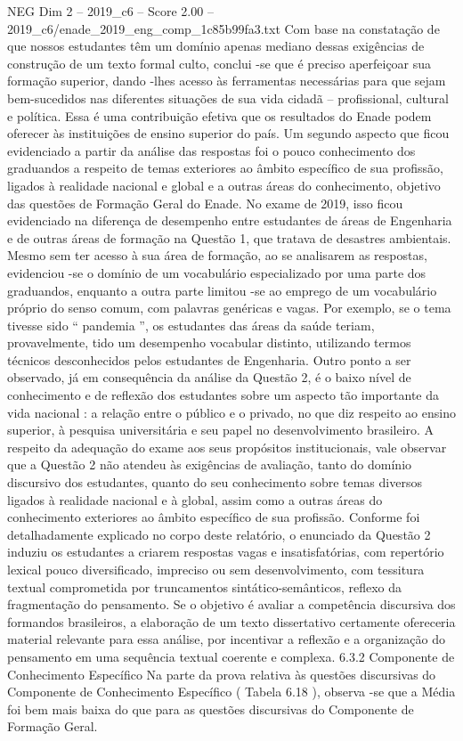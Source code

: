 \begin{textsample}{NEG Dim 2 – 2019\_c6 – Score 2.00 – 2019\_c6/enade\_2019\_eng\_comp\_1c85b99fa3.txt}
Com base na constatação de que nossos estudantes têm um domínio apenas mediano dessas exigências de construção de um texto formal culto, conclui -se que é preciso aperfeiçoar sua formação superior, dando -lhes acesso às ferramentas necessárias para que sejam bem-sucedidos nas diferentes situações de sua vida cidadã – profissional, cultural e política.
Essa é uma contribuição efetiva que os resultados do Enade podem oferecer às instituições de ensino superior do país.
Um segundo aspecto que ficou evidenciado a partir da análise das respostas foi o pouco conhecimento dos graduandos a respeito de temas exteriores ao âmbito específico de sua profissão, ligados à realidade nacional e global e a outras áreas do conhecimento, objetivo das questões de Formação Geral do Enade.
No exame de 2019, isso ficou evidenciado na diferença de desempenho entre estudantes de áreas de Engenharia e de outras áreas de formação na Questão 1, que tratava de desastres ambientais.
Mesmo sem ter acesso à sua área de formação, ao se analisarem as respostas, evidenciou -se o domínio de um vocabulário especializado por uma parte dos graduandos, enquanto a outra parte limitou -se ao emprego de um vocabulário próprio do senso comum, com palavras genéricas e vagas.
Por exemplo, se o tema tivesse sido “ pandemia ”, os estudantes das áreas da saúde teriam, provavelmente, tido um desempenho vocabular distinto, utilizando termos técnicos desconhecidos pelos estudantes de Engenharia.
Outro ponto a ser observado, já em consequência da análise da Questão 2, é o baixo nível de conhecimento e de reflexão dos estudantes sobre um aspecto tão importante da vida nacional : a relação entre o público e o privado, no que diz respeito ao ensino superior, à pesquisa universitária e seu papel no desenvolvimento brasileiro.
A respeito da adequação do exame aos seus propósitos institucionais, vale observar que a Questão 2 não atendeu às exigências de avaliação, tanto do domínio discursivo dos estudantes, quanto do seu conhecimento sobre temas diversos ligados à realidade nacional e à global, assim como a outras áreas do conhecimento exteriores ao âmbito específico de sua profissão.
Conforme foi detalhadamente explicado no corpo deste relatório, o enunciado da Questão 2 induziu os estudantes a criarem respostas vagas e insatisfatórias, com repertório lexical pouco diversificado, impreciso ou sem desenvolvimento, com tessitura textual comprometida por truncamentos sintático-semânticos, reflexo da fragmentação do pensamento.
Se o objetivo é avaliar a competência discursiva dos formandos brasileiros, a elaboração de um texto dissertativo certamente ofereceria material relevante para essa análise, por incentivar a reflexão e a organização do pensamento em uma sequência textual coerente e complexa. 6.3.2 Componente de Conhecimento Específico Na parte da prova relativa às questões discursivas do Componente de Conhecimento Específico ( Tabela 6.18 ), observa -se que a Média foi bem mais baixa do que para as questões discursivas do Componente de Formação Geral.

\end{textsample}
